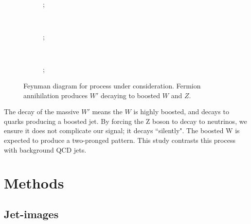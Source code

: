 \documentclass[twocolumn]{article}
\begin{document}
	\begin{figure}[]
		\centering
		\begin{subfigure}[t]{1.0\columnwidth}
			\centering
			;
		\end{subfigure}%
		\\ 
		\begin{subfigure}[t]{0.45\columnwidth}
			\centering
			;
		\end{subfigure}
		~
		\begin{subfigure}[t]{0.45\columnwidth}
			\centering
			;
		\end{subfigure}
	\caption{Feynman diagram for process under consideration. Fermion annihilation produces $W'$ decaying to boosted $W$ and $Z$.}
	\label{fig:feynmans}
	\end{figure}

The decay of the massive $W'$ means the $W$ is highly boosted, and decays to quarks producing a boosted jet. By forcing the Z boson to decay to neutrinos, we ensure it does not complicate our signal; it decays ``silently". The boosted W is expected to produce a two-pronged pattern. This study contrasts this process with background QCD jets.
 





\section{Methods}
\label{sec:methods}

\subsection{Jet-images}
\end{document}
